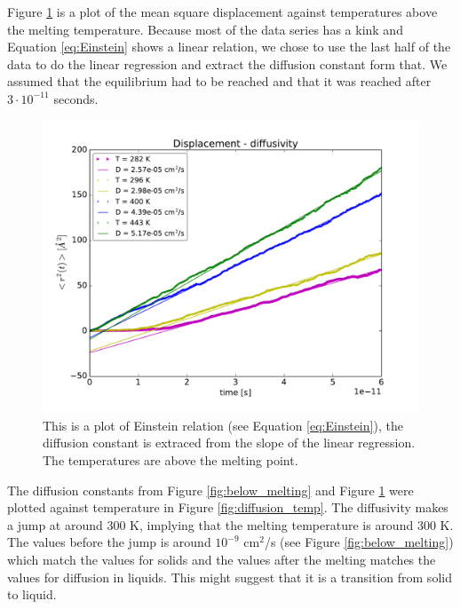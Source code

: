Figure \ref{fig:above_melting} is a plot of the mean square displacement against temperatures above the melting temperature. Because most of the data series has a kink and Equation \ref{eq:Einstein} shows a linear relation, we chose to use the last half of the data to do the linear regression and extract the diffusion constant form that. We assumed that the equilibrium had to be reached and that it was reached after $3\cdot 10^{-11}$ seconds.

\begin{figure}[H]
\center
\includegraphics[width=0.7\linewidth]{../figures/above_melting}\caption{This is a plot of Einstein relation (see Equation \ref{eq:Einstein}), the diffusion constant is extraced from the slope of the linear regression. The temperatures are above the melting point.}\label{fig:above_melting}
\end{figure}


The diffusion constants from Figure \ref{fig:below_melting} and Figure \ref{fig:above_melting} were plotted against temperature in Figure \ref{fig:diffusion_temp}. The diffusivity makes a jump at around 300 K, implying that the melting temperature is around 300 K. The values before the jump is around $10^{-9}$ cm$^2$/s (see Figure \ref{fig:below_melting}) which match the values for solids and the values after the melting matches the values for diffusion in liquids. This might suggest that it is a transition from solid to liquid.

